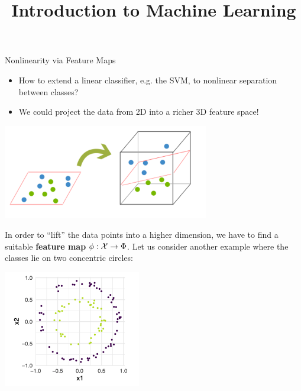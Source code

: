 




\newcommand{\titlefigure}{figure_man/kernel_intro_2.png}
\newcommand{\learninggoals}{
  \item Understand how nonlinearity can be introduced via feature maps in SVMs
  \item Know the limitation of feature maps 
}

\title{Introduction to Machine Learning}
\date{}





\begin{vbframe}{Nonlinearity via Feature Maps}
\begin{itemize}
\item How to extend a linear classifier, e.g. the SVM, to nonlinear separation between classes? 
\item We could project the data from 2D into a richer 3D feature space!
\end{itemize}

\vspace{1cm} 
\begin{center}
\includegraphics[width=9cm]{figure_man/kernels/svm_dummies_kernelling.PNG}
\end{center}

\framebreak 


  In order to \enquote{lift} the data points into a higher dimension, we have to find a suitable \textbf{feature map} $\phi : \mathcal{X} \to \Phi$.
Let us consider another example where the classes lie on two concentric circles:

\begin{center}
\includegraphics[width=6cm]{figure_man/kernel_intro_1.png}
\end{center}


\end{vbframe}

